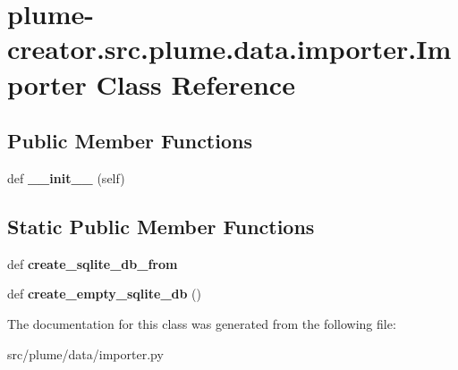 \hypertarget{classplume-creator_1_1src_1_1plume_1_1data_1_1importer_1_1_importer}{}\section{plume-\/creator.src.\+plume.\+data.\+importer.\+Importer Class Reference}
\label{classplume-creator_1_1src_1_1plume_1_1data_1_1importer_1_1_importer}
\subsection*{Public Member Functions}
\begin{DoxyCompactItemize}
\item 
def {\bfseries \+\_\+\+\_\+init\+\_\+\+\_\+} (self)\hypertarget{classplume-creator_1_1src_1_1plume_1_1data_1_1importer_1_1_importer_aac625889012822ef9bf76b2a2150774d}{}\label{classplume-creator_1_1src_1_1plume_1_1data_1_1importer_1_1_importer_aac625889012822ef9bf76b2a2150774d}

\end{DoxyCompactItemize}
\subsection*{Static Public Member Functions}
\begin{DoxyCompactItemize}
\item 
def {\bfseries create\+\_\+sqlite\+\_\+db\+\_\+from}\hypertarget{classplume-creator_1_1src_1_1plume_1_1data_1_1importer_1_1_importer_a78fbc895f88d318396f4a8acb24b83a5}{}\label{classplume-creator_1_1src_1_1plume_1_1data_1_1importer_1_1_importer_a78fbc895f88d318396f4a8acb24b83a5}

\item 
def {\bfseries create\+\_\+empty\+\_\+sqlite\+\_\+db} ()\hypertarget{classplume-creator_1_1src_1_1plume_1_1data_1_1importer_1_1_importer_a877d52c88f24e1ab66eeb0eb6b503678}{}\label{classplume-creator_1_1src_1_1plume_1_1data_1_1importer_1_1_importer_a877d52c88f24e1ab66eeb0eb6b503678}

\end{DoxyCompactItemize}


The documentation for this class was generated from the following file\+:\begin{DoxyCompactItemize}
\item 
src/plume/data/importer.\+py\end{DoxyCompactItemize}
